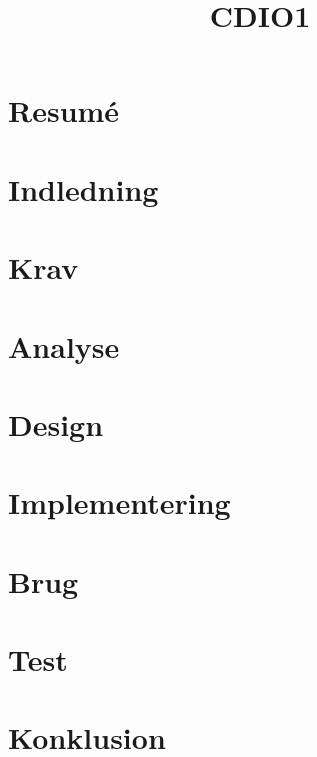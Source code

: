 \documentclass[12pt,oneside,a4paper,english]{article}
\title{CDIO1} %
\begin{document}


\newpage
\doublespacing
\renewcommand{\baselinestretch}{1}\normalsize
\tableofcontents
\renewcommand{\baselinestretch}{1}\normalsize
\thispagestyle{fancy} %

\newpage
{} 


\section{Resumé} \label{resume}

\section{Indledning} \label{introduction}
 
\newpage
\section{Krav} \label{demands}

\newpage
\section{Analyse} \label{analysis}

\newpage
\section{Design} \label{design}

\newpage
\section{Implementering} \label{implementation}

\newpage
\section{Brug} \label{brug}

\newpage
\section{Test} \label{test}

\newpage
\section{Konklusion} \label{conclusion}

\label{EndOfText}
\end{document}
